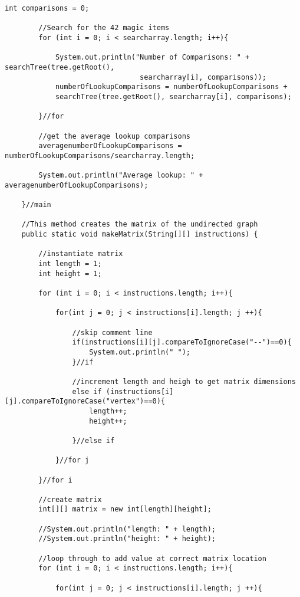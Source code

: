 \documentclass[letterpaper, 10pt,DIV=13]{scrartcl}
\numberwithin{equation}{section} %
\numberwithin{figure}{section} %
\numberwithin{table}{section} %
\begin{document}
\begin{lstlisting}[frame=single, ]
        int comparisons = 0;

        //Search for the 42 magic items
        for (int i = 0; i < searcharray.length; i++){

            System.out.println("Number of Comparisons: " + searchTree(tree.getRoot(), 
                                searcharray[i], comparisons));
            numberOfLookupComparisons = numberOfLookupComparisons + 
            searchTree(tree.getRoot(), searcharray[i], comparisons);
            
        }//for

        //get the average lookup comparisons
        averagenumberOfLookupComparisons = numberOfLookupComparisons/searcharray.length;

        System.out.println("Average lookup: " + averagenumberOfLookupComparisons);

    }//main

    //This method creates the matrix of the undirected graph
    public static void makeMatrix(String[][] instructions) {

        //instantiate matrix
        int length = 1;
        int height = 1;

        for (int i = 0; i < instructions.length; i++){

            for(int j = 0; j < instructions[i].length; j ++){

                //skip comment line
                if(instructions[i][j].compareToIgnoreCase("--")==0){
                    System.out.println(" ");
                }//if

                //increment length and heigh to get matrix dimensions
                else if (instructions[i][j].compareToIgnoreCase("vertex")==0){
                    length++;
                    height++;
                    
                }//else if

            }//for j

        }//for i

        //create matrix
        int[][] matrix = new int[length][height];

        //System.out.println("length: " + length);
        //System.out.println("height: " + height);

        //loop through to add value at correct matrix location
        for (int i = 0; i < instructions.length; i++){

            for(int j = 0; j < instructions[i].length; j ++){


\end{lstlisting}
\end{document}
